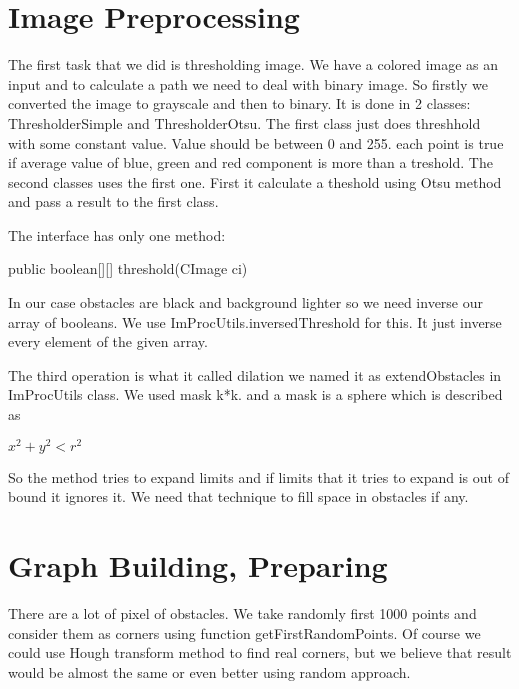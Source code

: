 \documentclass[12pt]{article}
\begin{document}
\maketitle

\begin{abstract}
  
\end{abstract}

\section{Image Preprocessing}

The first task that we did is thresholding image. We have a colored image as an input and to calculate a path we need to deal with binary image. So firstly we converted the image to grayscale and then to binary. It is done in 2 classes: ThresholderSimple and ThresholderOtsu. The first class just does threshhold with some constant value. Value should be between 0 and 255. each point is true if average value of blue, green and red component is more than a treshold. The second classes uses the first one. First it calculate a theshold using Otsu method and pass a result to the first class.

The interface has only one method:

    public boolean[][] threshold(CImage ci)

In our case obstacles are black and background lighter so we need inverse our array of booleans. We use ImProcUtils.inversedThreshold for this. It just inverse every element of the given array.

The third operation is what it called dilation we named it as extendObstacles in ImProcUtils class. We used mask k*k. and a mask is a sphere which is described as

$x^2 + y^2 < r^2$

So the method tries to expand limits and if limits that it tries to expand is out of bound it ignores it. We need that technique to fill space in obstacles if any.

\section{Graph Building, Preparing}

There are a lot of pixel of obstacles. We take randomly first 1000 points and consider them as corners using function getFirstRandomPoints. Of course we could use Hough transform method to find real corners, but we believe that result would be almost the same or even better using random approach.
\end{document}

